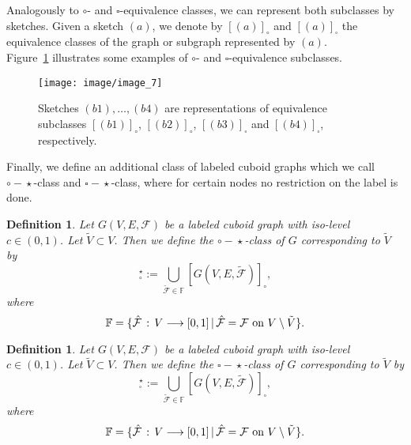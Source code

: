 \documentclass[a4paper,11pt]{article}
\newtheorem{definition}[theorem]{Definition}
\begin{document}
Analogously to
$\circ$- and $\square$-equivalence classes, we can represent both subclasses by sketches.
Given a sketch $(a)$, we denote by $[(a)]_{\circ}$ and $[(a)]_{\square}$ the equivalence
classes of the graph or subgraph represented by $(a)$.\\

\noindent Figure~\ref{image_7} illustrates some examples of $\circ$- and $\square$-equivalence
subclasses.
\begin{figure}[!ht]
\texttt{[image: image/image\_7]}
\caption{Sketches $(b1),\ldots,(b4)$ are representations of equivalence subclasses
$[(b1)]_{\circ}$, $[(b2)]_{\circ}$, $[(b3)]_{\square}$ and $[(b4)]_{\square}$, respectively.}
\label{image_7}
\end{figure}
\FloatBarrier

Finally, we define an additional class of labeled cuboid graphs which we call $\circ\!-\!\star$-class and
$\square\!-\!\star$-class, where for certain nodes no restriction on the label is done.
\begin{definition}
Let $G(V,E,\mathcal{F})$ be a labeled cuboid graph with iso-level $c\in (0,1)$. Let
$\tilde{V}\subset V$. Then we define the $\circ\!-\!\star$-class of $G$ corresponding to $\tilde{V}$ by
\begin{equation}
[G(V,E,\mathcal{F};\tilde{V})]_{\circ}^{\star}:=\bigcup_{\tilde{\mathcal{F}}\in\mathbb{F}}
[G(V,E,\tilde{\mathcal{F}})]_{\circ},
\label{eq:equivalence-3}
\end{equation}
where
\begin{equation}
\mathbb{F}=\{\hat{\mathcal{F}}\,:\,V\longrightarrow [0,1]\,|\,\hat{\mathcal{F}}=\mathcal{F}\mbox{ on }
V\setminus\tilde{V}\mbox\}.
\label{eq:equivalence-4}
\end{equation}
\label{def:equivalence-3}
\end{definition}

\begin{definition}
Let $G(V,E,\mathcal{F})$ be a labeled cuboid graph with iso-level $c\in (0,1)$. Let $\tilde{V}\subset V$.
Then we define the $\square\!-\!\star$-class of $G$ corresponding to $\tilde{V}$ by
\begin{equation}
[G(V,E,\mathcal{F};\tilde{V})]_{\square}^{\star}:=\bigcup_{\tilde{\mathcal{F}}\in\mathbb{F}}[G(V,E,\tilde{\mathcal{F}})]_{\square},
\label{eq:equivalence-5}
\end{equation}
where
\begin{equation}
\mathbb{F}=\{\hat{\mathcal{F}}\,:\,V\longrightarrow [0,1]\,|\,\hat{\mathcal{F}}=\mathcal{F}\mbox{ on }
V\setminus\tilde{V}\mbox\}.
\label{eq:equivalence-6}
\end{equation}
\label{def:equivalence-4}
\end{definition}
\end{document}
